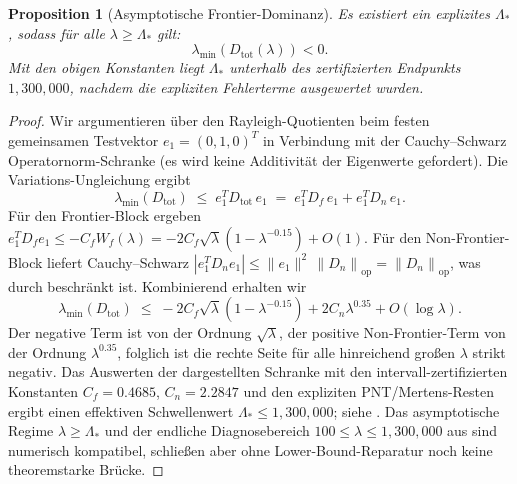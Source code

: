 \documentclass[11pt,a4paper]{article}
\newtheorem{proposition}[proposition]{Proposition}
\theoremstyle{remark}
\theoremstyle{plain}
\newcommand{\norm}[1]{\left\lVert #1 \right\rVert}
\begin{document}
\begin{proposition}[Asymptotische Frontier-Dominanz]
\label{prop:frontier-dominance}
Es existiert ein explizites $\Lambda_*$, sodass für alle $\lambda\geq\Lambda_*$ gilt:
\[
  \lambda_{\min}(D_{\mathrm{tot}}(\lambda))<0.
\]
Mit den obigen Konstanten liegt $\Lambda_*$ unterhalb des zertifizierten Endpunkts $1{,}300{,}000$, nachdem die expliziten Fehlerterme ausgewertet wurden.
\end{proposition}

\begin{proof}
Wir argumentieren über den Rayleigh-Quotienten beim festen gemeinsamen Testvektor $e_1=(0,1,0)^T$ in Verbindung mit der Cauchy--Schwarz Operatornorm-Schranke (es wird keine Additivität der Eigenwerte gefordert). Die Variations-Ungleichung ergibt
\[
  \lambda_{\min}(D_{\mathrm{tot}})
  \;\leq\;
  e_1^T D_{\mathrm{tot}}\, e_1
  \;=\;
  e_1^T D_f\, e_1 + e_1^T D_n\, e_1.
\]
Für den Frontier-Block ergeben  $e_1^T D_f e_1 \leq -C_f W_f(\lambda) = -2C_f\sqrt\lambda(1-\lambda^{-0.15})+O(1)$.
Für den Non-Frontier-Block liefert Cauchy--Schwarz $|e_1^T D_n e_1| \leq \|e_1\|^2\,\norm{D_n}_{\mathrm{op}} = \norm{D_n}_{\mathrm{op}}$, was durch  beschränkt ist. Kombinierend erhalten wir
\[
  \lambda_{\min}(D_{\mathrm{tot}})
  \;\leq\;
  -2C_f\sqrt\lambda(1-\lambda^{-0.15})
  + 2C_n\lambda^{0.35}
  + O(\log\lambda).
\]
Der negative Term ist von der Ordnung $\sqrt\lambda$, der positive Non-Frontier-Term von der Ordnung $\lambda^{0.35}$, folglich ist die rechte Seite für alle hinreichend großen $\lambda$ strikt negativ. Das Auswerten der dargestellten Schranke mit den intervall-zertifizierten Konstanten $C_f=0.4685$, $C_n=2.2847$ und den expliziten PNT/Mertens-Resten ergibt einen effektiven Schwellenwert $\Lambda_*\leq 1{,}300{,}000$; siehe \cite[Proposition~A6 (Direct Frontier-Dominance), Bemerkung zu direkten Beweiszutaten]{GeigerLandscapeII}. Das asymptotische Regime $\lambda\geq\Lambda_*$ und der endliche Diagnosebereich $100\leq\lambda\leq 1{,}300{,}000$ aus  sind numerisch kompatibel, schließen aber ohne Lower-Bound-Reparatur noch keine theoremstarke Brücke.
\end{proof}
\end{document}
